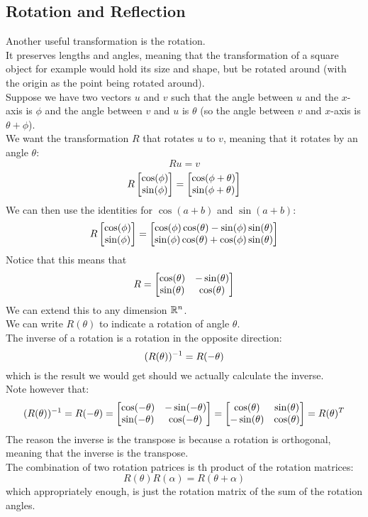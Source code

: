 \documentclass[12pt]{article}
\begin{document}
\newpage

\subsection*{Rotation and Reflection}

Another useful transformation is the rotation. \\
It preserves lengths and angles,
meaning that the transformation of a square object
for example would hold its size and shape, but be rotated
around (with the origin as the point being rotated around). \\

Suppose we have two vectors $u$ and $v$
such that the angle between $u$ and the $x$-axis
is $\phi$ and the angle between $v$ and $u$
is $\theta$ (so the angle between $v$
and $x$-axis is $\theta + \phi$). \\
We want the transformation $R$
that rotates $u$ to $v$,
meaning that it rotates by an angle $\theta$:
\[ Ru = v \]
\[ R\begin{bmatrix} \cos(\phi) \\ \sin(\phi) \end{bmatrix}
= \begin{bmatrix} \cos(\phi + \theta) \\ \sin(\phi + \theta) \end{bmatrix} \]
We can then use the identities for
$\cos(a + b)$ and $\sin(a+b)$:
\[ R\begin{bmatrix} \cos(\phi) \\ \sin(\phi) \end{bmatrix}
= \begin{bmatrix} \cos(\phi)\cos(\theta) - \sin(\phi)\sin(\theta) \\ \sin(\phi)\cos(\theta) + \cos(\phi)\sin(\theta) \end{bmatrix} \]
Notice that this means that
\[R = \begin{bmatrix} \cos(\theta) & -\sin(\theta) \\ \sin(\theta) & \cos(\theta) \end{bmatrix} \]
We can extend this to any dimension $\mathbb{R}^n$. \\
We can write $R(\theta)$ to indicate
a rotation of angle $\theta$. \\

The inverse of a rotation is a rotation
in the opposite direction:
\[ (R(\theta))^{-1} = R(-\theta) \]
which is the result we would get should we
actually calculate the inverse. \\
Note however that:
\[ (R(\theta))^{-1} = R(-\theta) 
= \begin{bmatrix} \cos(-\theta) & -\sin(-\theta) \\ \sin(-\theta) & \cos(-\theta) \end{bmatrix}
= \begin{bmatrix} \cos(\theta) & \sin(\theta) \\ -\sin(\theta) & \cos(\theta) \end{bmatrix} = R(\theta)^T \]
The reason the inverse is the transpose 
is because a rotation is orthogonal,
meaning that the inverse is the transpose. \\

The combination of two rotation patrices
is th product of the rotation matrices:
\[ R(\theta)R(\alpha) = R(\theta + \alpha) \]
which appropriately enough, is just the rotation
matrix of the sum of the rotation angles. \\
\end{document}
